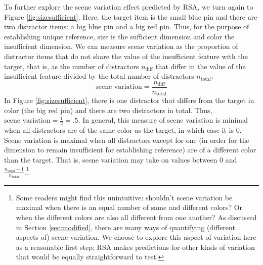 \documentclass[11pt]{article}
\newcommand{\figref}[1]{Figure \ref{#1}}
\newcommand{\sectionref}[1]{Section \ref{#1}}
\begin{document}
To further explore the scene variation effect predicted by RSA, we turn again to \figref{fig:sizesufficient}. Here, the target item is the small blue pin and there are two distractor items: a big blue pin and a big red pin. Thus, for the purpose of establishing unique reference, size is the sufficient dimension and color the insufficient dimension. 
We can measure scene variation as the proportion of distractor items that do not share the value of the insufficient feature with the target, that is, as the number of distractors $n_{\textrm{diff}}$ that differ in the value of the insufficient feature divided by the total number of distractors $n_{\textrm{total}}$:
\begin{equation*}
	\textrm{scene variation} = \frac{n_{\textrm{diff}}}{n_{\textrm{total}}}
\end{equation*}
In \figref{fig:sizesufficient}, there is one distractor that differs from the target in color (the big red pin) and there are two distractors in total.  Thus, $\textrm{scene variation} = \frac{1}{2} = .5$. In general, this measure of scene variation is minimal when all distractors are of the same color as the target, in which case it is 0. Scene variation is maximal when all distractors except for one (in order for the dimension to remain insufficient for establishing reference) are of a different color than the target. That is, scene variation may take on values between 0 and $\frac{n_{\textrm{total}} - 1}{n_{\textrm{total}}}$.\footnote{Some readers might find this unintuitive: shouldn't scene variation be maximal when there is an equal number of same and different colors? Or when the different colors are also all different from one another? As discussed in \sectionref{sec:modified}, there are many ways of quantifying (different aspects of) scene variation. We choose to explore this aspect of variation here as a reasonable first step; RSA makes predictions for other kinds of variation that would be equally straightforward to test.}
\end{document}
